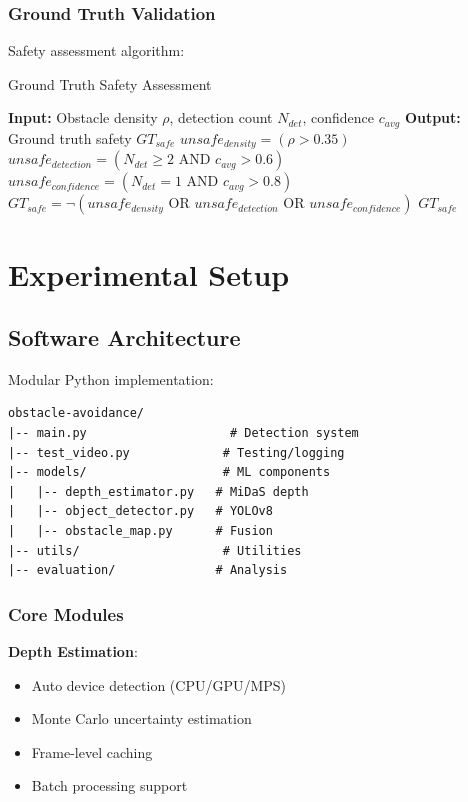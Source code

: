 \documentclass[12pt,oneside]{book}
\begin{document}
\subsubsection{Ground Truth Validation}

Safety assessment algorithm:

\begin{algorithm}
\caption{Ground Truth Safety Assessment}
\begin{algorithmic}
\STATE \textbf{Input:} Obstacle density $\rho$, detection count $N_{det}$, confidence $c_{avg}$
\STATE \textbf{Output:} Ground truth safety $GT_{safe}$
\STATE $unsafe_{density} = (\rho > 0.35)$
\STATE $unsafe_{detection} = (N_{det} \geq 2 \text{ AND } c_{avg} > 0.6)$
\STATE $unsafe_{confidence} = (N_{det} = 1 \text{ AND } c_{avg} > 0.8)$
\STATE $GT_{safe} = \neg(unsafe_{density} \text{ OR } unsafe_{detection} \text{ OR } unsafe_{confidence})$
\RETURN $GT_{safe}$
\end{algorithmic}
\end{algorithm}

\section{Experimental Setup}

\subsection{Software Architecture}

Modular Python implementation:

\begin{verbatim}
obstacle-avoidance/
|-- main.py                    # Detection system
|-- test_video.py             # Testing/logging
|-- models/                   # ML components
|   |-- depth_estimator.py   # MiDaS depth
|   |-- object_detector.py   # YOLOv8
|   |-- obstacle_map.py      # Fusion
|-- utils/                    # Utilities
|-- evaluation/              # Analysis
\end{verbatim}

\subsubsection{Core Modules}

\textbf{Depth Estimation}:
\begin{itemize}
\item Auto device detection (CPU/GPU/MPS)
\item Monte Carlo uncertainty estimation
\item Frame-level caching
\item Batch processing support
\end{itemize}
\end{document}
